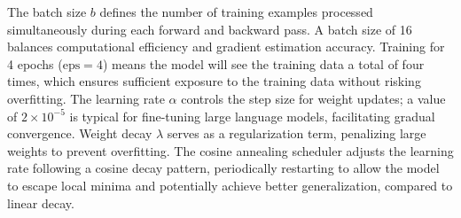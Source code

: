 \documentclass[11pt]{article}
\begin{document}
The batch size \( b \) defines the number of training examples processed simultaneously during each forward and backward pass. A batch size of 16 balances computational efficiency and gradient estimation accuracy. Training for 4 epochs (\( \text{eps} = 4 \)) means the model will see the training data a total of four times, which ensures sufficient exposure to the training data without risking overfitting. The learning rate \( \alpha \) controls the step size for weight updates; a value of \( 2 \times 10^{-5} \) is typical for fine-tuning large language models, facilitating gradual convergence. Weight decay \( \lambda \) serves as a regularization term, penalizing large weights to prevent overfitting. The cosine annealing scheduler adjusts the learning rate following a cosine decay pattern, periodically restarting to allow the model to escape local minima and potentially achieve better generalization, compared to linear decay.
\end{document}
